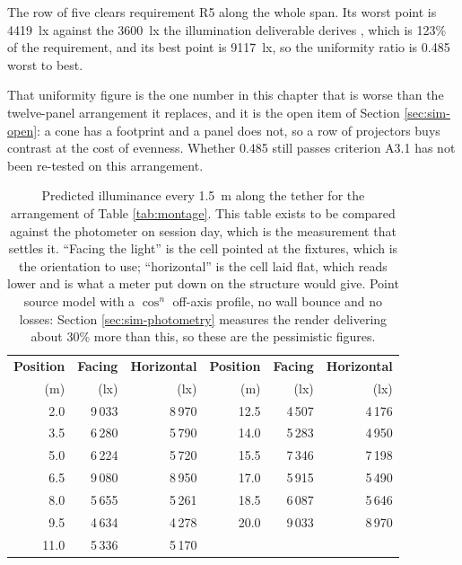The row of five clears requirement R5 along the whole span. Its worst point
is 4419~lx against the 3600~lx the illumination deliverable derives
\cite{linku_darkroom_illumination}, which is 123\% of the requirement, and
its best point is 9117~lx, so the uniformity ratio is 0.485 worst to best.

That uniformity figure is the one number in this chapter that is worse than
the twelve-panel arrangement it replaces, and it is the open item of Section
\ref{sec:sim-open}: a cone has a footprint and a panel does not, so a row of
projectors buys contrast at the cost of evenness. Whether 0.485 still passes
criterion A3.1 has not been re-tested on this arrangement.

\begin{table}[htbp]
\centering
\caption[Predicted illuminance along the tether]{Predicted illuminance every
1.5~m along the tether for the arrangement of Table \ref{tab:montage}. This
table exists to be compared against the photometer on session day, which is
the measurement that settles it. ``Facing the light'' is the cell pointed at
the fixtures, which is the orientation to use; ``horizontal'' is the cell
laid flat, which reads lower and is what a meter put down on the structure
would give. Point source model with a $\cos^n$ off-axis profile, no wall
bounce and no losses: Section \ref{sec:sim-photometry} measures the render
delivering about 30\% more than this, so these are the pessimistic figures.}
\label{tab:lux-profile}
\begin{tabular}{@{}r r r@{\hskip 2cm} r r r@{}}
\toprule
\textbf{Position} & \textbf{Facing} & \textbf{Horizontal} &
\textbf{Position} & \textbf{Facing} & \textbf{Horizontal} \\
(m) & (lx) & (lx) & (m) & (lx) & (lx) \\
\midrule
 2.0 & 9\,033 & 8\,970 & 12.5 & 4\,507 & 4\,176 \\
 3.5 & 6\,280 & 5\,790 & 14.0 & 5\,283 & 4\,950 \\
 5.0 & 6\,224 & 5\,720 & 15.5 & 7\,346 & 7\,198 \\
 6.5 & 9\,080 & 8\,950 & 17.0 & 5\,915 & 5\,490 \\
 8.0 & 5\,655 & 5\,261 & 18.5 & 6\,087 & 5\,646 \\
 9.5 & 4\,634 & 4\,278 & 20.0 & 9\,033 & 8\,970 \\
11.0 & 5\,336 & 5\,170 &      &        &        \\
\bottomrule
\end{tabular}
\end{table}

